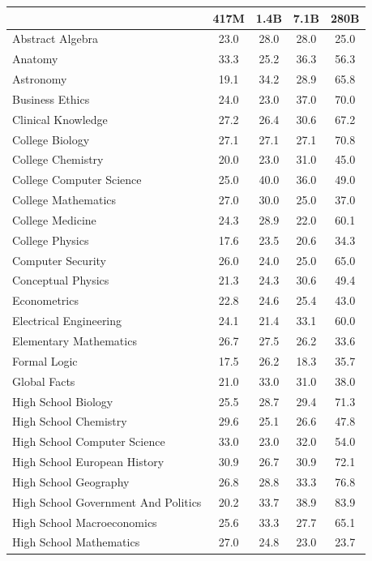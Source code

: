 \documentclass[11pt, a4paper, logo, internal, copyright, nonumbering]{deepmind}
\begin{document}
\begin{table}[h!]
\scriptsize
    \centering
    \begin{tabular}{lcccc}
 \toprule 
 & \textbf{417M} & \textbf{1.4B} & \textbf{7.1B} & \textbf{280B}\\
 \midrule
Abstract Algebra & 23.0 & 28.0 & 28.0 & 25.0 \\
Anatomy & 33.3 & 25.2 & 36.3 & 56.3 \\
Astronomy & 19.1 & 34.2 & 28.9 & 65.8 \\
Business Ethics & 24.0 & 23.0 & 37.0 & 70.0 \\
Clinical Knowledge & 27.2 & 26.4 & 30.6 & 67.2 \\
College Biology & 27.1 & 27.1 & 27.1 & 70.8 \\
College Chemistry & 20.0 & 23.0 & 31.0 & 45.0 \\
College Computer Science & 25.0 & 40.0 & 36.0 & 49.0 \\
College Mathematics & 27.0 & 30.0 & 25.0 & 37.0 \\
College Medicine & 24.3 & 28.9 & 22.0 & 60.1 \\
College Physics & 17.6 & 23.5 & 20.6 & 34.3 \\
Computer Security & 26.0 & 24.0 & 25.0 & 65.0 \\
Conceptual Physics & 21.3 & 24.3 & 30.6 & 49.4 \\
Econometrics & 22.8 & 24.6 & 25.4 & 43.0 \\
Electrical Engineering & 24.1 & 21.4 & 33.1 & 60.0 \\
Elementary Mathematics & 26.7 & 27.5 & 26.2 & 33.6 \\
Formal Logic & 17.5 & 26.2 & 18.3 & 35.7 \\
Global Facts & 21.0 & 33.0 & 31.0 & 38.0 \\
High School Biology & 25.5 & 28.7 & 29.4 & 71.3 \\
High School Chemistry & 29.6 & 25.1 & 26.6 & 47.8 \\
High School Computer Science & 33.0 & 23.0 & 32.0 & 54.0 \\
High School European History & 30.9 & 26.7 & 30.9 & 72.1 \\
High School Geography & 26.8 & 28.8 & 33.3 & 76.8 \\
High School Government And Politics & 20.2 & 33.7 & 38.9 & 83.9 \\
High School Macroeconomics & 25.6 & 33.3 & 27.7 & 65.1 \\
High School Mathematics & 27.0 & 24.8 & 23.0 & 23.7 \\

\end{tabular}
\end{table}
\end{document}
